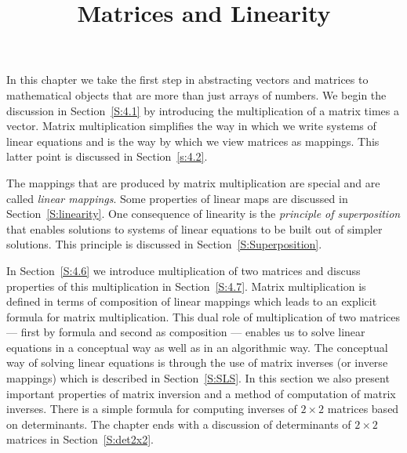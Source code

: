 \documentclass{ximera}
\title{Matrices and Linearity}
\begin{document}
\begin{abstract}
\end{abstract}
\maketitle

  \label{chap:matrices}

\normalsize

In this chapter we take the first step in abstracting vectors and matrices 
to mathematical objects that are more than just arrays of numbers.  We begin 
the discussion in Section~\ref{S:4.1} by introducing the multiplication of a 
matrix times a vector.  Matrix multiplication simplifies the way in which we 
write systems of linear equations and is the way by which we view matrices as 
mappings.  This latter point is discussed in Section~\ref{s:4.2}.

The mappings that are produced by matrix multiplication are special and
are called {\em linear mappings}.  Some properties of
linear maps are discussed in Section~\ref{S:linearity}.  One consequence of
linearity is the {\em principle of superposition\/} that enables
solutions to systems of linear equations to be built out of simpler
solutions.  This principle is discussed in Section~\ref{S:Superposition}.


In Section~\ref{S:4.6} we introduce 
multiplication of two matrices and discuss properties of this multiplication
in Section~\ref{S:4.7}.  Matrix multiplication is defined in terms of
composition of linear mappings which leads to an explicit formula for matrix
multiplication.   This dual role of multiplication of two matrices ---
first by formula and second as composition --- enables us to solve
linear equations in a conceptual way as well as in an algorithmic way.
The conceptual way of solving linear equations is through the use of
matrix inverses (or inverse mappings) which is described in
Section~\ref{S:SLS}.  In this section we also present
important properties of matrix inversion and a method of computation
of matrix inverses.  There is a simple formula for computing inverses
of $2\times 2$ matrices based on determinants.  The chapter ends with a 
discussion of determinants of $2\times 2$ matrices in Section~\ref{S:det2x2}.
\end{document}
